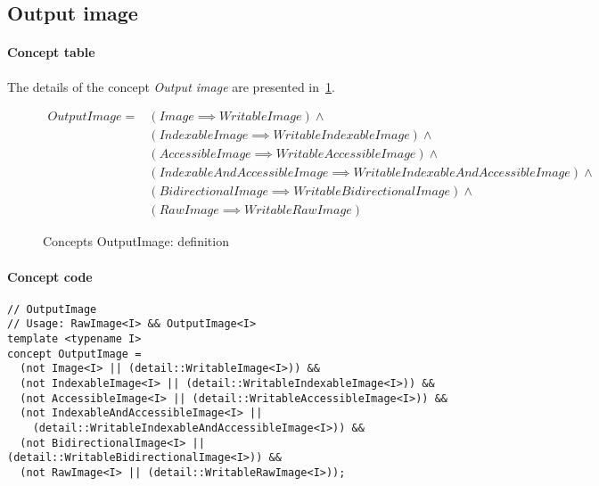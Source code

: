 \clearpage

\subsection{Output image}

\paragraph{Concept table}


The details of the concept \emph{Output image} are presented in~\cref{table:concept.image.expressions.8}.

\begin{figure}[htbp]
  \begin{scriptsize}
    \begin{equation}
      \begin{aligned}
        OutputImage ={} & (Image \implies WritableImage) \wedge                                             \\
                        & (IndexableImage \implies WritableIndexableImage) \wedge                           \\
                        & (AccessibleImage \implies WritableAccessibleImage) \wedge                         \\
                        & (IndexableAndAccessibleImage \implies WritableIndexableAndAccessibleImage) \wedge \\
                        & (BidirectionalImage \implies WritableBidirectionalImage) \wedge                   \\
                        & (RawImage \implies WritableRawImage)
      \end{aligned}
    \end{equation}
    \smallskip

    \caption{Concepts OutputImage: definition}
  \end{scriptsize}
  \label{table:concept.image.expressions.8}
\end{figure}

\paragraph{Concept code}

\begin{verbatim}
// OutputImage
// Usage: RawImage<I> && OutputImage<I>
template <typename I>
concept OutputImage =
  (not Image<I> || (detail::WritableImage<I>)) &&
  (not IndexableImage<I> || (detail::WritableIndexableImage<I>)) &&
  (not AccessibleImage<I> || (detail::WritableAccessibleImage<I>)) &&
  (not IndexableAndAccessibleImage<I> ||
    (detail::WritableIndexableAndAccessibleImage<I>)) &&
  (not BidirectionalImage<I> || (detail::WritableBidirectionalImage<I>)) &&
  (not RawImage<I> || (detail::WritableRawImage<I>));
\end{verbatim}
